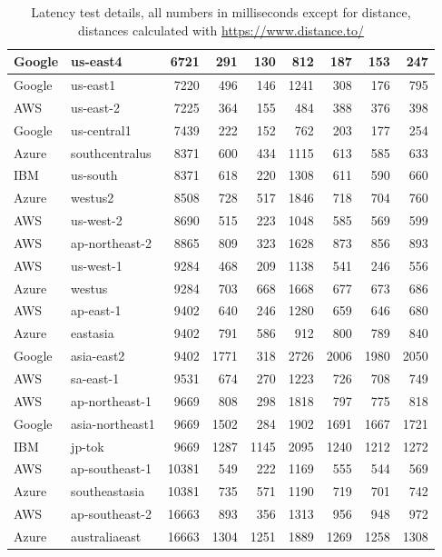 \begin{table}[h]
{\begin{tabular}{|l|l|r|r|r|r|r|r|r|}
Google	&	us-east4	&	6721	&	291	&	130	&	812	&	187	&	153	&	247	\\	\hline
Google	&	us-east1	&	7220	&	496	&	146	&	1241	&	308	&	176	&	795	\\	\hline
AWS	&	us-east-2	&	7225	&	364	&	155	&	484	&	388	&	376	&	398	\\	\hline
Google	&	us-central1	&	7439	&	222	&	152	&	762	&	203	&	177	&	254	\\	\hline
Azure	&	southcentralus	&	8371	&	600	&	434	&	1115	&	613	&	585	&	633	\\	\hline
IBM	&	us-south	&	8371	&	618	&	220	&	1308	&	611	&	590	&	660	\\	\hline
Azure	&	westus2	&	8508	&	728	&	517	&	1846	&	718	&	704	&	760	\\	\hline
AWS	&	us-west-2	&	8690	&	515	&	223	&	1048	&	585	&	569	&	599	\\	\hline
AWS	&	ap-northeast-2	&	8865	&	809	&	323	&	1628	&	873	&	856	&	893	\\	\hline
AWS	&	us-west-1	&	9284	&	468	&	209	&	1138	&	541	&	246	&	556	\\	\hline
Azure	&	westus	&	9284	&	703	&	668	&	1668	&	677	&	673	&	686	\\	\hline
AWS	&	ap-east-1	&	9402	&	640	&	246	&	1280	&	659	&	646	&	680	\\	\hline
Azure	&	eastasia	&	9402	&	791	&	586	&	912	&	800	&	789	&	840	\\	\hline
Google	&	asia-east2	&	9402	&	1771	&	318	&	2726	&	2006	&	1980	&	2050	\\	\hline
AWS	&	sa-east-1	&	9531	&	674	&	270	&	1223	&	726	&	708	&	749	\\	\hline
AWS	&	ap-northeast-1	&	9669	&	808	&	298	&	1818	&	797	&	775	&	818	\\	\hline
Google	&	asia-northeast1	&	9669	&	1502	&	284	&	1902	&	1691	&	1667	&	1721	\\	\hline
IBM	&	jp-tok	&	9669	&	1287	&	1145	&	2095	&	1240	&	1212	&	1272	\\	\hline
AWS	&	ap-southeast-1	&	10381	&	549	&	222	&	1169	&	555	&	544	&	569	\\	\hline
Azure	&	southeastasia	&	10381	&	735	&	571	&	1190	&	719	&	701	&	742	\\	\hline
AWS	&	ap-southeast-2	&	16663	&	893	&	356	&	1313	&	956	&	948	&	972	\\	\hline
Azure	&	australiaeast	&	16663	&	1304	&	1251	&	1889	&	1269	&	1258	&	1308	\\	\hline
    \end{tabular}}
    \caption[Latency test details]{Latency test details, all numbers in milliseconds except for distance, distances calculated with \href{https://www.distance.to/}{https://www.distance.to/}}
    \label{tab:latency}
\end{table}
\renewcommand{\arraystretch}{1}

